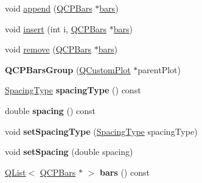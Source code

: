 \begin{DoxyCompactItemize}
\item 
void \hyperlink{class_q_c_p_bars_group_a809ed63cc4ff7cd5b0b8c96b470163d3}{append} (\hyperlink{class_q_c_p_bars}{Q\+C\+P\+Bars} $\ast$\hyperlink{class_q_c_p_bars_group_a7c72ed1f8cd962c93b8c42ab96cd91ec}{bars})
\item 
void \hyperlink{class_q_c_p_bars_group_a309a5f7233db189f3ea9c2d04ece6c13}{insert} (int i, \hyperlink{class_q_c_p_bars}{Q\+C\+P\+Bars} $\ast$\hyperlink{class_q_c_p_bars_group_a7c72ed1f8cd962c93b8c42ab96cd91ec}{bars})
\item 
void \hyperlink{class_q_c_p_bars_group_a215e28a5944f1159013a0e19169220e7}{remove} (\hyperlink{class_q_c_p_bars}{Q\+C\+P\+Bars} $\ast$\hyperlink{class_q_c_p_bars_group_a7c72ed1f8cd962c93b8c42ab96cd91ec}{bars})
\item 
{\bfseries Q\+C\+P\+Bars\+Group} (\hyperlink{class_q_custom_plot}{Q\+Custom\+Plot} $\ast$parent\+Plot)\hypertarget{class_q_c_p_bars_group_aa4e043b9a22c6c5ea0f93740aca063e1}{}\label{class_q_c_p_bars_group_aa4e043b9a22c6c5ea0f93740aca063e1}

\item 
\hyperlink{class_q_c_p_bars_group_a4c0521120a97e60bbca37677a37075b6}{Spacing\+Type} {\bfseries spacing\+Type} () const \hypertarget{class_q_c_p_bars_group_a1bb562f669d47bd7d3cdd2da1f7d8f00}{}\label{class_q_c_p_bars_group_a1bb562f669d47bd7d3cdd2da1f7d8f00}

\item 
double {\bfseries spacing} () const \hypertarget{class_q_c_p_bars_group_a730bffefcac6c97aaf60e6f64dd3bcd9}{}\label{class_q_c_p_bars_group_a730bffefcac6c97aaf60e6f64dd3bcd9}

\item 
void {\bfseries set\+Spacing\+Type} (\hyperlink{class_q_c_p_bars_group_a4c0521120a97e60bbca37677a37075b6}{Spacing\+Type} spacing\+Type)\hypertarget{class_q_c_p_bars_group_a2c7e2d61b10594a4555b615e1fcaf49e}{}\label{class_q_c_p_bars_group_a2c7e2d61b10594a4555b615e1fcaf49e}

\item 
void {\bfseries set\+Spacing} (double spacing)\hypertarget{class_q_c_p_bars_group_aa553d327479d72a0c3dafcc724a190e2}{}\label{class_q_c_p_bars_group_aa553d327479d72a0c3dafcc724a190e2}

\item 
\hyperlink{class_q_list}{Q\+List}$<$ \hyperlink{class_q_c_p_bars}{Q\+C\+P\+Bars} $\ast$ $>$ {\bfseries bars} () const \hypertarget{class_q_c_p_bars_group_a2e8766bf5d4e101444515df96ab490bf}{}\label{class_q_c_p_bars_group_a2e8766bf5d4e101444515df96ab490bf}


\end{DoxyCompactItemize}

